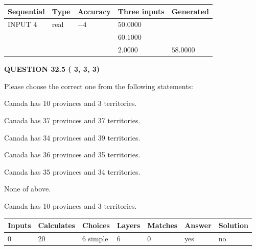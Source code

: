 \documentclass[12pt]{article}
\begin{document}
   
  
  
\noindent\begin{tabular}{|l|l|l|l|l|}
\hline
 Sequential & Type & Accuracy & Three inputs & Generated \\ 
\hline
 
 
  INPUT $           4$ & real & $          -4 $ & $
 50.0000
  $ & \\
  & & &  $
 60.1000
  $ & \\
  & & &  $
 2.0000
 $ & $ 58.0000 $ 
 \\  \hline  
 \end{tabular}
   
   
  
\vspace{0.2in}
  
{\textbf{\Large{QUESTION
32.5 
 (          3,          3,          3)
}}}
  
  
Please choose the correct one from the following statements:
 
 
Canada has  %
10 provinces and  %
3 territories.
 
 
Canada has  %
37 provinces and  %
37 territories.
 
 
Canada has  %
34 provinces and  %
39 territories.
 
 
Canada has  %
36 provinces and  %
35 territories.
 
 
Canada has  %
35 provinces and  %
34 territories.
 
 
 None of above.
 
 
\noindent{}
 
 
Canada has  %
10 provinces and  %
3 territories.
 
 
\noindent{}
 
 
   
   
   
   
\noindent\begin{tabular}{|l|l|l|l|l|l|l|}
 \hline
Inputs & Calculates & Choices & Layers & Matches & Answer & Solution \\ \hline
           0 & 
          20 & 
           6
  simple  
  & 
           6 & 
           0 & 
  yes & 
  no 
  \\ \hline
 \end{tabular}
   
\end{document}
